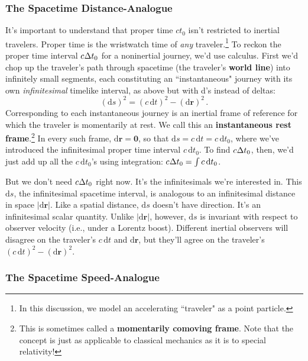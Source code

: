 \documentclass[12pt]{article}
\renewcommand{\vv}[1]{\mathbf{#1}}
\newcommand{\dd}[1]{\mathrm{d}#1}
\begin{document}
\subsubsection{The Spacetime Distance-Analogue}\label{sssec:ds}

It's important to understand that proper time $ct_0$ isn't restricted to inertial travelers. Proper time is the wristwatch time of \emph{any} traveler.\footnote{\label{fn:tr}In this discussion, we model an accelerating ``traveler" as a point particle.} To reckon the proper time interval $c \mkern.5mu \Delta t_0$ for a noninertial journey, we'd use calculus. First we'd chop up the traveler's path through spacetime (the traveler's \textbf{world line}) into infinitely small segments, each constituting an ``instantaneous" journey with its own \emph{infinitesimal} timelike interval, as above but with d's instead of deltas:
\begin{equation}\label{eq:24}
\boxed{(\dd s)^2 =(c \, \dd t)^2 - (\dd \vv r)^2} \, .
\end{equation}
Corresponding to each instantaneous journey is an inertial frame of reference for which the traveler is momentarily at rest. We call this an \textbf{instantaneous rest frame}.\footnote{This is sometimes called a \textbf{momentarily comoving frame}. Note that the concept is just as applicable to classical mechanics as it is to special relativity!} In every such frame, $\dd \vv r = \vv 0$, so that $\dd s = c \,\dd t = c \, \dd t_0$, where we've introduced the infinitesimal proper time interval $c \, \dd t_0$. To find $c \mkern.5mu \Delta t_0$, then, we'd just add up all the $c \, \dd t_0$'s using integration: $c \mkern.5mu \Delta t_0 = \int c \, \dd t_0$.

But we don't need $c \mkern.5mu \Delta t_0$ right now. It's the infinitesimals we're interested in. This $\dd s$, the infinitesimal spacetime interval, is analogous to an infinitesimal distance in space $\vert \dd \vv r \vert$. Like a spatial distance, $\dd s$ doesn't have direction. It's an infinitesimal scalar quantity. Unlike $\vert \dd \vv r \vert$, however, $\dd s$ is invariant with respect to observer velocity (i.e., under a Lorentz boost). Different inertial observers will disagree on the traveler's $c \, \dd t$ and $\dd \vv r$, but they'll agree on the traveler's $(c \, \dd t)^2 - (\dd \vv r)^2$.

\subsubsection{The Spacetime Speed-Analogue}\label{sssec:b}
\end{document}
